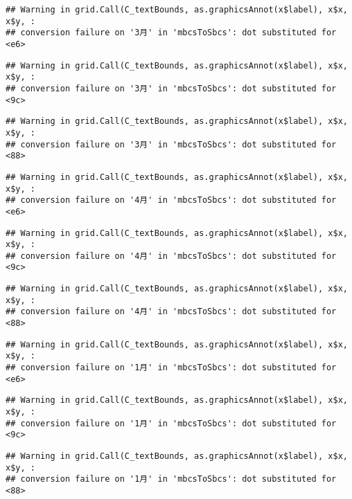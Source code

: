 \documentclass[]{ctexart}
\begin{document}
\begin{verbatim}
## Warning in grid.Call(C_textBounds, as.graphicsAnnot(x$label), x$x, x$y, :
## conversion failure on '3月' in 'mbcsToSbcs': dot substituted for <e6>
\end{verbatim}

\begin{verbatim}
## Warning in grid.Call(C_textBounds, as.graphicsAnnot(x$label), x$x, x$y, :
## conversion failure on '3月' in 'mbcsToSbcs': dot substituted for <9c>
\end{verbatim}

\begin{verbatim}
## Warning in grid.Call(C_textBounds, as.graphicsAnnot(x$label), x$x, x$y, :
## conversion failure on '3月' in 'mbcsToSbcs': dot substituted for <88>
\end{verbatim}

\begin{verbatim}
## Warning in grid.Call(C_textBounds, as.graphicsAnnot(x$label), x$x, x$y, :
## conversion failure on '4月' in 'mbcsToSbcs': dot substituted for <e6>
\end{verbatim}

\begin{verbatim}
## Warning in grid.Call(C_textBounds, as.graphicsAnnot(x$label), x$x, x$y, :
## conversion failure on '4月' in 'mbcsToSbcs': dot substituted for <9c>
\end{verbatim}

\begin{verbatim}
## Warning in grid.Call(C_textBounds, as.graphicsAnnot(x$label), x$x, x$y, :
## conversion failure on '4月' in 'mbcsToSbcs': dot substituted for <88>
\end{verbatim}

\begin{verbatim}
## Warning in grid.Call(C_textBounds, as.graphicsAnnot(x$label), x$x, x$y, :
## conversion failure on '1月' in 'mbcsToSbcs': dot substituted for <e6>
\end{verbatim}

\begin{verbatim}
## Warning in grid.Call(C_textBounds, as.graphicsAnnot(x$label), x$x, x$y, :
## conversion failure on '1月' in 'mbcsToSbcs': dot substituted for <9c>
\end{verbatim}

\begin{verbatim}
## Warning in grid.Call(C_textBounds, as.graphicsAnnot(x$label), x$x, x$y, :
## conversion failure on '1月' in 'mbcsToSbcs': dot substituted for <88>
\end{verbatim}
\end{document}
